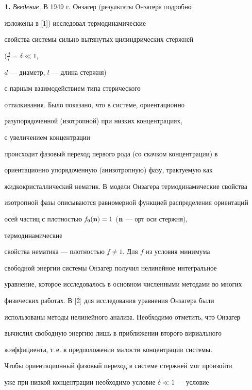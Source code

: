 \label{begin}








{\bf 1.} {\it Введение.} В 1949 г. Онзагер (результаты Онзагера подробно


изложены в [1]) исследовал термодинамические 


свойства системы сильно вытянутых цилиндрических стержней 


($\frac{d}{l}=\delta\ll1$,


$d$ --- диаметр, $l$ --- длина стержня)


с парным взаимодействием типа стерического 


отталкивания. Было показано, что в системе, ориентационно 


разупорядоченной (изотропной) при низких концентрациях,


с увеличением концентрации 


происходит фазовый переход первого рода (со скачком концентрации) в 


ориентационно упорядоченную (анизотропную) фазу, трактуемую как


жидкокристаллический нематик. В модели Онзагера термодинамические свойства 


изотропной фазы описываются равномерной функцией распределения ориентаций


осей частиц с плотностью $f_0(\bold n)=1$ ($\bold n$ --- орт оси стержня), 


термодинамические 


свойства нематика --- плотностью $f\ne1$. Для $f$ из условия минимума 


свободной энергии системы Онзагер получил нелинейное интегральное 


уравнение, которое исследовалось в основном численными методами во многих 


физических работах. В [2] для исследования уравнения Онзагера были 


использованы методы нелинейного анализа. Необходимо отметить, что Онзагер 


вычислил свободную энергию лишь в приближении второго вириального 


коэффициента, т.\,е. в предположении малости концентрации системы. 


Чтобы ориентационный фазовый переход в системе стержней мог произойти 


уже при низкой концентрации необходимо условие $\delta\ll1$ --- условие 


